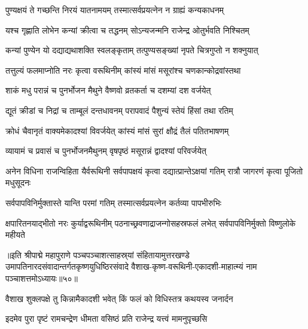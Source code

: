 \twolineshloka
{पुण्यक्षयं ते गच्छन्ति निरयं यातनामयम्}
{तस्मात्सर्वप्रयत्नेन न ग्राह्यं कन्यकाधनम्}%

\twolineshloka
{यश्च गृह्णाति लोभेन कन्यां क्रीत्वा च तद्धनम्}
{सोऽन्यजन्मनि राजेन्द्र ओतुर्भवति निश्चितम्}%

\twolineshloka
{कन्यां पुण्येन यो दद्याद्यथाशक्ति स्वलङ्कृताम्}
{तत्पुण्यसङ्ख्यां नृपते चित्रगुप्तो न शक्नुयात्}%

\twolineshloka
{तत्तुल्यं फलमाप्नोति नरः कृत्वा वरूथिनीम्}
{कांस्यं मांसं मसूरांश्च चणकान्कोद्रवांस्तथा}%

\twolineshloka
{शाकं मधु परान्नं च पुनर्भोजन मैथुने}
{वैष्णवो व्रतकर्ता च दशम्यां दश वर्जयेत्}%

\twolineshloka
{द्यूतं क्रीडां च निद्रां च ताम्बूलं दन्तधावनम्}
{परापवादं पैशुन्यं स्तेयं हिंसां तथा रतिम्}%

\twolineshloka
{क्रोधं चैवानृतं वाक्यमेकादश्यां विवर्जयेत्}
{कांस्यं मांसं सुरां क्षौद्रं  तैलं पतितभाषणम्}%

\twolineshloka
{व्यायामं च प्रवासं च पुनर्भोजनमैथुनम्}
{वृषपृष्ठं मसूरान्नं द्वादश्यां परिवर्जयेत्}%

\threelineshloka
{अनेन विधिना राजन्विहिता यैर्वरूथिनी}
{सर्वपापक्षयं कृत्वा दद्यात्प्रान्तेऽक्षयां गतिम्}
{रात्रौ जागरणं कृत्वा पूजितो मधुसूदनः}%

\twolineshloka
{सर्वपापविनिर्मुक्तास्ते यान्ति परमां गतिम्}
{तस्मात्सर्वप्रयत्नेन कर्तव्या पापभीरुभिः}%

\threelineshloka
{क्षपारितनयाद्भीतो नरः कुर्याद्वरूथिनीम्}
{पठनाच्छ्रवणाद्राजन्गोसहस्रफलं लभेत्}
{सर्वपापविनिर्मुक्तो विष्णुलोके महीयते}%

॥इति श्रीपाद्मे महापुराणे पञ्चपञ्चाशत्साहस्र्यां संहितायामुत्तरखण्डे उमापतिनारदसंवादान्तर्गतकृष्णयुधिष्ठिरसंवादे वैशाख-कृष्ण-वरूथिनी-एकादशी-माहात्म्यं नाम पञ्चाशत्तमोऽध्यायः॥५०॥


\hyperref[sec:ekadashi_mahatmyam_padma_puranam]{\closesub}
\clearpage

\label{sec:padma-vaishakha-shukla-mohini}



\twolineshloka
{वैशाख शुक्लपक्षे तु किन्नामैकादशी भवेत्}
{किं फलं को विधिस्तत्र कथयस्व जनार्दन}%


\twolineshloka
{इदमेव पुरा पृष्टं रामचन्द्रेण धीमता}
{वसिष्ठं प्रति राजेन्द्र यत्त्वं मामनुपृच्छसि}%

